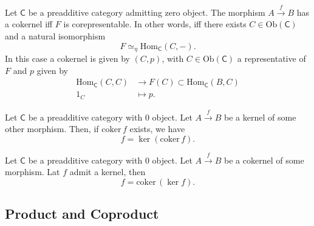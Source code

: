 \begin{prop}
	Let $\mathsf{C}$ be a preadditive category admitting zero object.
	The morphism $A \xrightarrow{f} B$ has a cokernel iff $F$ is corepresentable.
	In other words, iff there exists $C \in \mathrm{Ob} \left(\mathsf{C}\right)$ and a natural isomorphism
	\begin{equation}
	F \simeq_\eta \mathrm{Hom}_{\mathsf{C}} \left( C, - \right)
	.\end{equation} 
	In this case a cokernel is given by $\left(C, p\right)$, with $C \in \mathrm{Ob} \left(\mathsf{C}\right)$ a representative of $F$ and $p$ given by
	\begin{align}
		\mathrm{Hom}_{\mathsf{C}} \left( C, C \right) &\to F(C) 
		\subset \mathrm{Hom}_{\mathsf{C}} \left( B, C \right)\\
		1_C &\mapsto p
	.\end{align} 
\end{prop} 

\begin{lem}
	Let $\mathsf{C}$ be a preadditive category with $0$ object.
	Let $A \xrightarrow{f} B$ be a kernel of some other morphism.
	Then, if $\mathrm{coker}\, f$ exists, we have
	\begin{equation}
		f = \ker \left( \mathrm{coker}\, f \right)
	.\end{equation} 
\end{lem} 

\begin{lem}
	Let $\mathsf{C}$ be a preadditive category with $0$ object.
	Let $A \xrightarrow{f} B$ be a cokernel of some morphism.
	Lat $f$ admit a kernel, then
	\begin{equation}
		f = \mathrm{coker}\, \left( \ker f \right)
	.\end{equation} 
\end{lem} 

\subsection{Product and Coproduct}

